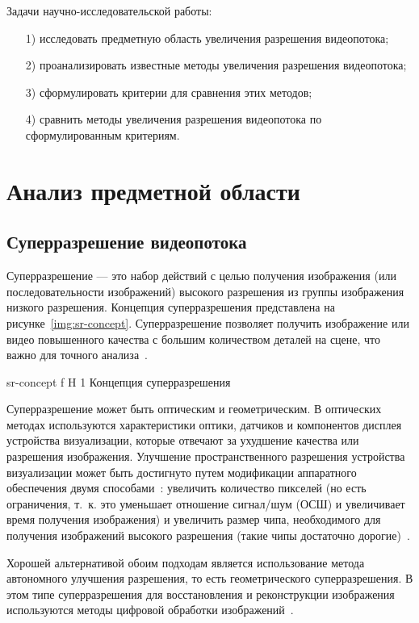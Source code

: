\documentclass{bmstu}
\begin{document}
Задачи научно-исследовательской работы:
\begin{enumerate}
\item[1)] исследовать предметную область увеличения разрешения видеопотока;
\item[2)] проанализировать известные методы увеличения разрешения видеопотока;
\item[3)] сформулировать критерии для сравнения этих методов;
\item[4)] сравнить методы увеличения разрешения видеопотока по сформулированным критериям.
\end{enumerate}

\chapter{Анализ предметной области}

\section{Суперразрешение видеопотока}

Суперразрешение --- это набор действий с целью получения изображения (или последовательности изображений) высокого разрешения из группы изображения низкого разрешения. 
Концепция суперразрешения представлена на рисунке~\ref{img:sr-concept}. 
Суперразрешение позволяет получить изображение или видео повышенного качества с большим количеством деталей на сцене, что важно для точного анализа~\cite{Daithankar2021}. 

    {sr-concept}
    {f}
    {H}
    {1\textwidth}
    {Концепция суперразрешения~\cite{Daithankar2021}}

Суперразрешение может быть оптическим и геометрическим. 
В оптических методах используются характеристики оптики, датчиков и компонентов дисплея устройства визуализации, которые отвечают за ухудшение качества или разрешения изображения. 
Улучшение пространственного разрешения устройства визуализации может быть достигнуто путем модификации аппаратного обеспечения двумя способами~\cite{Daithankar2021}: увеличить количество пикселей (но есть ограничения, т.~к. это уменьшает отношение сигнал/шум (ОСШ) и увеличивает время получения изображения) и увеличить размер чипа, необходимого для получения изображений высокого разрешения (такие чипы достаточно дорогие)~\cite{Park2003}.

Хорошей альтернативой обоим подходам является использование метода автономного улучшения разрешения, то есть геометрического суперразрешения. В этом типе суперразрешения для восстановления и реконструкции изображения используются методы цифровой обработки изображений~\cite{Daithankar2021}.
\end{document}
